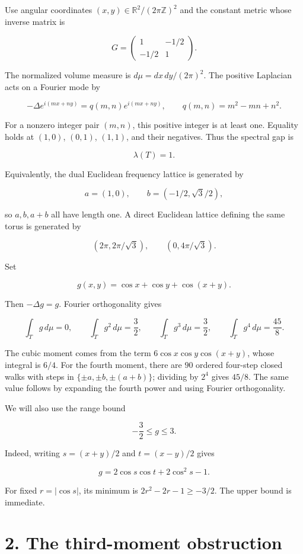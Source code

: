 \documentclass[11pt,a4paper]{article}
\begin{document}
Use angular coordinates \((x,y)\in\mathbb R^2/(2\pi\mathbb Z)^2\) and
the constant metric whose inverse matrix is

\[
G=\begin{pmatrix}1&-1/2\\-1/2&1\end{pmatrix}.
\]

The normalized volume measure is \(d\mu=dx\,dy/(2\pi)^2\). The positive
Laplacian acts on a Fourier mode by

\[
-\Delta e^{i(mx+ny)}=q(m,n)e^{i(mx+ny)},\qquad
q(m,n)=m^2-mn+n^2.
\]

For a nonzero integer pair \((m,n)\), this positive integer is at least
one. Equality holds at \((1,0)\), \((0,1)\), \((1,1)\), and their
negatives. Thus the spectral gap is

\[
\lambda(T)=1.
\]

Equivalently, the dual Euclidean frequency lattice is generated by

\[
a=(1,0),\qquad b=(-1/2,\sqrt3/2),
\]

so \(a,b,a+b\) all have length one. A direct Euclidean lattice defining
the same torus is generated by

\[
(2\pi,2\pi/\sqrt3),\qquad (0,4\pi/\sqrt3).
\]

Set

\[
g(x,y)=\cos x+\cos y+\cos(x+y).
\]

Then \(-\Delta g=g\). Fourier orthogonality gives

\[
\int_T g\,d\mu=0,\qquad
\int_T g^2\,d\mu=\frac32,\qquad
\int_T g^3\,d\mu=\frac32,\qquad
\int_T g^4\,d\mu=\frac{45}{8}.
\tag{1}
\]

The cubic moment comes from the term \(6\cos x\cos y\cos(x+y)\), whose
integral is \(6/4\). For the fourth moment, there are \(90\) ordered
four-step closed walks with steps in \(\{\pm a,\pm b,\pm(a+b)\}\);
dividing by \(2^4\) gives \(45/8\). The same value follows by expanding
the fourth power and using Fourier orthogonality.

We will also use the range bound

\[
-\frac32\leq g\leq3.
\tag{2}
\]

Indeed, writing \(s=(x+y)/2\) and \(t=(x-y)/2\) gives

\[
g=2\cos s\cos t+2\cos^2s-1.
\]

For fixed \(r=|\cos s|\), its minimum is \(2r^2-2r-1\geq-3/2\). The
upper bound is immediate.

\hypertarget{1019-the-third-moment-obstruction}{%
\section{2. The third-moment
obstruction}\label{1019-the-third-moment-obstruction}}
\end{document}
